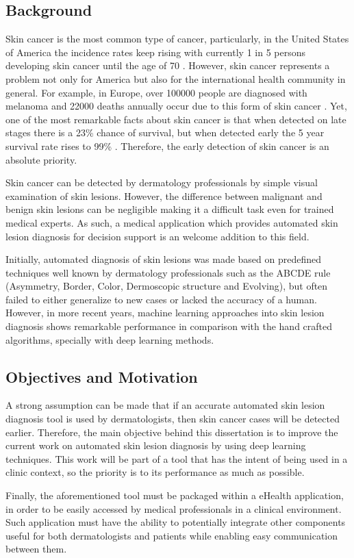 \documentclass[journal,compsoc]{IEEEtran}
\begin{document}
\subsection{Background}
Skin cancer is the most common type of cancer, particularly, in the United States of America the incidence rates keep rising with currently 1 in 5 persons developing skin cancer until the age of 70 \cite{Foundation2019}. However, skin cancer represents a problem not only for America but also for the international health community in general. For example, in Europe, over 100000 people are diagnosed with melanoma and 22000 deaths annually occur due to this form of skin cancer \cite{Bray2018}.  Yet, one of the most remarkable facts about skin cancer is that when detected on late stages there is a 23\% chance of survival, but when detected early the 5 year survival rate rises to 99\% \cite{Foundation2019}. Therefore, the early detection of skin cancer is an absolute priority. \par
Skin cancer can be detected by dermatology professionals by simple visual examination of skin lesions. However, the difference between malignant and benign skin lesions can be negligible making it a difficult task even for trained medical experts. As such, a medical application which provides automated skin lesion diagnosis for decision support is an welcome addition to this field. \par
Initially, automated diagnosis of skin lesions was made based on predefined techniques well known by dermatology professionals such as the ABCDE rule (Asymmetry, Border, Color, Dermoscopic structure and Evolving), but often failed to either generalize to new cases or lacked the accuracy of a human. However, in more recent years, machine learning approaches into skin lesion diagnosis shows remarkable performance in comparison with the hand crafted algorithms, specially with deep learning methods\cite{Esteva2017}\cite{Haenssle2018}. 
\subsection{Objectives and Motivation}
A strong assumption can be made that if an accurate automated skin lesion diagnosis tool is used by dermatologists, then skin cancer cases will be detected earlier. Therefore, the main objective behind this dissertation is to improve the current work on automated skin lesion diagnosis by using deep learning techniques. This work will be part of a tool that has the intent of being used in a clinic context, so the priority is to its performance as much as possible. \par 
Finally, the aforementioned tool must be packaged within a eHealth application, in order to be easily accessed by medical professionals in a clinical environment. Such application must have the ability to potentially integrate other components useful for both dermatologists and patients while enabling easy communication between them. 
\end{document}
